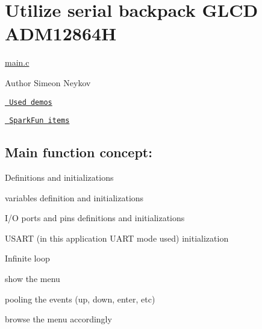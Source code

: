 \section*{Utilize serial backpack G\+L\+CD A\+D\+M12864H}

\mbox{\hyperlink{main_8c}{main.\+c}}

\begin{DoxyAuthor}{Author}
Simeon Neykov
\end{DoxyAuthor}
\href{https://www.avrfreaks.net/forum/tut-c-bit-manipulation-aka-programming-101?name=PNphpBB2&file=viewtopic&t=37871}{\texttt{ Used demos}}

\href{https://learn.sparkfun.com/tutorials/serial-graphic-lcd-hookup/?_ga=1.12355956.1126191215.1366741676}{\texttt{ Spark\+Fun items}}

\subsection*{Main function concept\+:}


\begin{DoxyItemize}
\item Definitions and initializations
\begin{DoxyItemize}
\item variables definition and initializations
\item I/O ports and pins definitions and initializations
\item U\+S\+A\+RT (in this application U\+A\+RT mode used) initialization
\end{DoxyItemize}
\item Infinite loop
\begin{DoxyItemize}
\item show the menu
\item pooling the events (up, down, enter, etc)
\item browse the menu accordingly 
\end{DoxyItemize}
\end{DoxyItemize}